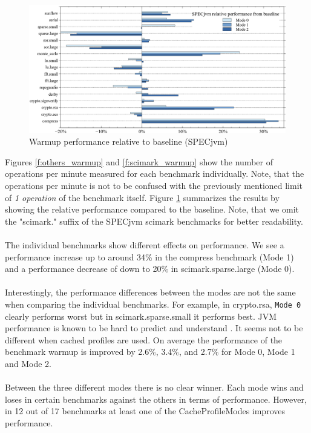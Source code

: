 \begin{figure}[ht!]
  \begin{center}
    \centering
    \includegraphics[width=1.0\textwidth]{figures/all_warmup_variation.png}
    \caption{Warmup performance relative to baseline (SPECjvm)}
    \label{f:all_warmup_variation}
  \end{center}
\end{figure}
Figures \ref{f:others_warmup} and \ref{f:scimark_warmup} show the number of operations per minute measured for each benchmark individually. Note, that the operations per minute is not to be confused with the previously mentioned limit of \textit{1 operation} of the benchmark itself.
Figure \ref{f:all_warmup_variation} summarizes the results by showing the relative performance compared to the baseline.
Note, that we omit the "scimark." suffix of the SPECjvm scimark benchmarks for better readability.
\\\\
The individual benchmarks show different effects on performance. We see a performance increase up to around 34\% in the compress benchmark (Mode 1) and a performance decrease of down to 20\% in scimark.sparse.large (Mode 0).
\\\\
Interestingly, the performance differences between the modes are not the same when comparing the individual benchmarks. For example, in crypto.rsa, \texttt{Mode 0} clearly performs worst but in scimark.sparse.small it performs best.
JVM performance is known to be hard to predict and understand \cite{georges2007statistically}. It seems not to be different when cached profiles are used. On average the performance of the benchmark warmup is improved by 2.6\%, 3.4\%, and 2.7\% for Mode 0, Mode 1 and Mode 2.
\\\\
Between the three different modes there is no clear winner. Each mode wins and loses in certain benchmarks against the others in terms of performance. However, in 12 out of 17 benchmarks at least one of the CacheProfileModes improves performance. 
